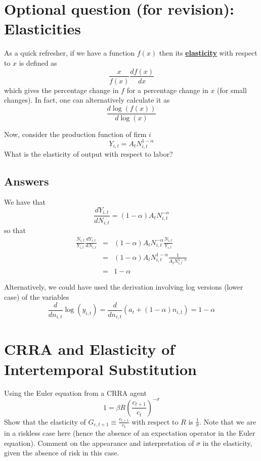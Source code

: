 \documentclass[authoryear,11pt]{elsarticle}
\begin{document}
\section{Optional question (for revision): Elasticities}
As a quick refresher, if we have a function $f(x)$ then its \href{https://en.wikipedia.org/wiki/Elasticity_of_a_function}{\textbf{elasticity}} with respect to $x$ is defined as
\[
 \frac{x}{f(x)} \frac{df(x)}{dx}
\]
which gives the percentage change in $f$ for a percentage change in $x$ (for small changes). In fact, one can alternatively calculate it as
\[
\frac{d \log{(f(x))}}{d \log{(x)} }
\]

Now, consider the production function of firm $i$
\[
Y_{i,t} = A_{t} N_{i,t}^{1-\alpha}
\]
What is the elasticity of output with respect to labor?

\subsection*{Answers}
We have that
\[
\frac{dY_{i,t}}{dN_{i,t}} = (1-\alpha)A_{t}N_{i,t}^{-\alpha}
\]
so that
\begin{eqnarray*}
\frac{N_{i,t}}{Y_{i,t}}\frac{dY_{i,t}}{dN_{i,t}} &=& (1-\alpha)A_{t}N_{i,t}^{-\alpha} \frac{N_{i,t}}{Y_{i,t}} \\
&=& (1-\alpha)A_{t}N_{i,t}^{1-\alpha} \frac{1}{A_{t} N_{i,t}^{1-\alpha}} \\
&=& 1-\alpha
\end{eqnarray*}

Alternatively, we could have used the derivation involving log versions (lower case) of the variables
\[
\frac{d}{dn_{i,t}} \log{(y_{i,t})} = \frac{d}{dn_{i,t}} (a_{t} + (1-\alpha)n_{i,t}) = 1-\alpha
\]

\section{CRRA and Elasticity of Intertemporal Substitution}
Using the Euler equation from a CRRA agent
\[
1 = \beta R \left( \frac{c_{t+1}}{c_{t}} \right)^{-\sigma}
\]
Show that the elasticity of $G_{c,t+1} \equiv \frac{c_{t+1}}{c_{t}}$ with respect to $R$ is $\frac{1}{\sigma}$. Note that we are in a riskless case here (hence the absence of an expectation operator in the Euler equation). Comment on the appearance and interpretation of $\sigma$ in the elasticity, given the absence of risk in this case.
\end{document}
